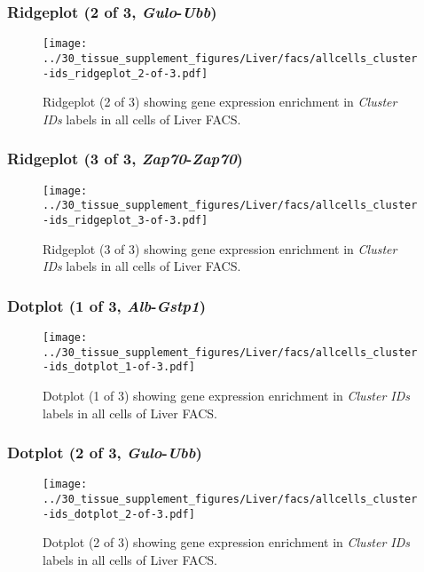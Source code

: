 \clearpage

\subsubsection{Ridgeplot (2 of 3, \emph{Gulo}-\emph{Ubb})}
\begin{figure}[h]
\centering
\texttt{[image: ../30\_tissue\_supplement\_figures/Liver/facs/allcells\_cluster-ids\_ridgeplot\_2-of-3.pdf]}

\caption{ Ridgeplot (2 of 3)  showing gene expression enrichment in \emph{Cluster IDs} labels in all cells of Liver FACS. }
\end{figure}


\clearpage

\subsubsection{Ridgeplot (3 of 3, \emph{Zap70}-\emph{Zap70})}
\begin{figure}[h]
\centering
\texttt{[image: ../30\_tissue\_supplement\_figures/Liver/facs/allcells\_cluster-ids\_ridgeplot\_3-of-3.pdf]}

\caption{ Ridgeplot (3 of 3)  showing gene expression enrichment in \emph{Cluster IDs} labels in all cells of Liver FACS. }
\end{figure}


\clearpage

\subsubsection{Dotplot (1 of 3, \emph{Alb}-\emph{Gstp1})}
\begin{figure}[h]
\centering
\texttt{[image: ../30\_tissue\_supplement\_figures/Liver/facs/allcells\_cluster-ids\_dotplot\_1-of-3.pdf]}

\caption{ Dotplot (1 of 3)  showing gene expression enrichment in \emph{Cluster IDs} labels in all cells of Liver FACS. }
\end{figure}


\clearpage

\subsubsection{Dotplot (2 of 3, \emph{Gulo}-\emph{Ubb})}
\begin{figure}[h]
\centering
\texttt{[image: ../30\_tissue\_supplement\_figures/Liver/facs/allcells\_cluster-ids\_dotplot\_2-of-3.pdf]}

\caption{ Dotplot (2 of 3)  showing gene expression enrichment in \emph{Cluster IDs} labels in all cells of Liver FACS. }
\end{figure}


